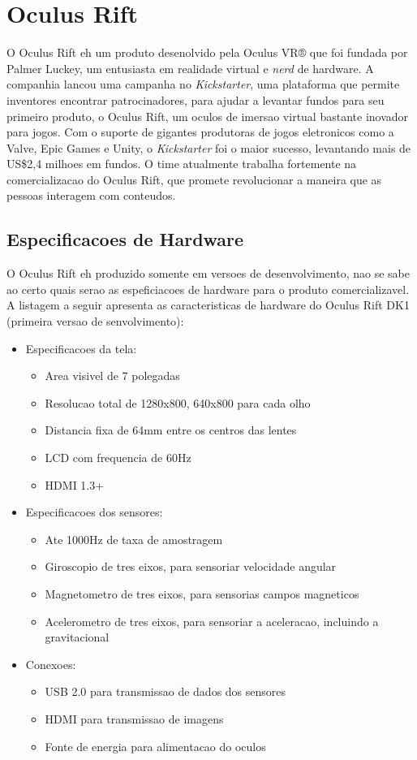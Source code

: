 \section{Oculus Rift} %
\label{sec:oculus_rift}

O Oculus Rift\cite{oculusVR} eh um produto desenolvido pela Oculus VR® que foi fundada por Palmer Luckey, um entusiasta em realidade virtual e \textit{nerd} de hardware. A companhia lancou uma campanha no \textit{Kickstarter}\cite{kickstarter}, uma plataforma que permite inventores encontrar patrocinadores, para ajudar a levantar fundos para seu primeiro produto, o Oculus Rift, um oculos de imersao virtual bastante inovador para jogos. Com o suporte de gigantes produtoras de jogos eletronicos como a Valve, Epic Games e Unity, o \textit{Kickstarter} foi o maior sucesso, levantando mais de US\$2,4 milhoes em fundos. O time atualmente trabalha fortemente na comercializacao do Oculus Rift, que promete revolucionar a maneira que as pessoas interagem com conteudos. 

\subsection{Especificacoes de Hardware}
O Oculus Rift eh produzido somente em versoes de desenvolvimento, nao se sabe ao certo quais serao as espeficiacoes de hardware para o produto comercializavel. A listagem a seguir apresenta as caracteristicas de hardware do Oculus Rift DK1 (primeira versao de senvolvimento):
\begin{itemize}
	\item Especificacoes da tela:
		\begin{itemize}
			\item Area visivel de 7 polegadas
			\item Resolucao total de 1280x800, 640x800 para cada olho
			\item Distancia fixa de 64mm entre os centros das lentes
			\item LCD com frequencia de 60Hz
			\item HDMI 1.3+
		\end{itemize}
	\item Especificacoes dos sensores:
		\begin{itemize}
			\item Ate 1000Hz de taxa de amostragem
			\item Giroscopio de tres eixos, para sensoriar velocidade angular
			\item Magnetometro de tres eixos, para sensorias campos magneticos
			\item Acelerometro de tres eixos, para sensoriar a aceleracao, incluindo a gravitacional
		\end{itemize}
	\item Conexoes:
		\begin{itemize}
			\item USB 2.0 para transmissao de dados dos sensores
			\item HDMI para transmissao de imagens
			\item Fonte de energia para alimentacao do oculos
		\end{itemize}
\end{itemize}

